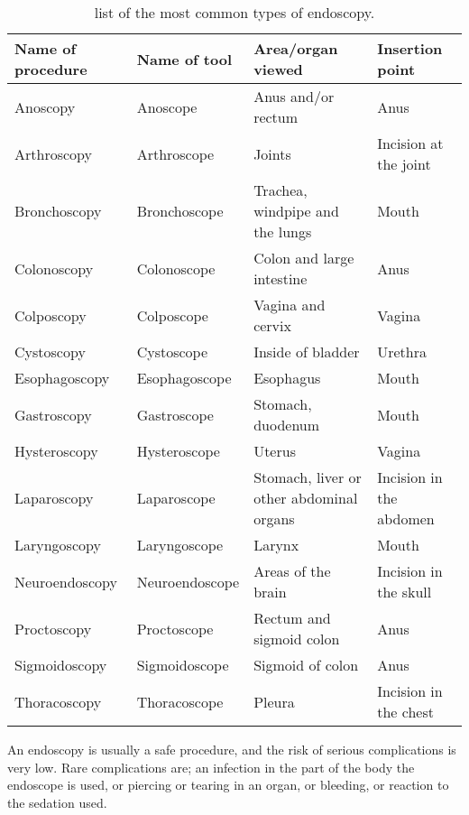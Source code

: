 \documentclass[thesis.tex]{subfiles}
\begin{document}
\begin{table} %
  \centering
  \begin{tabular}{ l l l l}
  	\hline
    Name of procedure	&Name of tool	&Area/organ viewed	&Insertion point	\\
    \hline
    Anoscopy			&Anoscope		&Anus and/or rectum	&Anus				\\
    Arthroscopy			&Arthroscope	&Joints				&Incision at the joint\\ 
    Bronchoscopy		&Bronchoscope	&Trachea, windpipe
    										and the lungs	&Mouth				\\ 
    Colonoscopy			&Colonoscope	&Colon and large
    										intestine		&Anus				\\				
    Colposcopy			&Colposcope		&Vagina and cervix	&Vagina				\\
    Cystoscopy			&Cystoscope		&Inside of bladder	&Urethra			\\
    Esophagoscopy		&Esophagoscope	&Esophagus			&Mouth				\\
    Gastroscopy			&Gastroscope	&Stomach, duodenum	&Mouth				\\
    Hysteroscopy		&Hysteroscope	&Uterus				&Vagina				\\
    Laparoscopy			&Laparoscope	&Stomach, liver or
    									other abdominal organs	&Incision in the abdomen \\
    Laryngoscopy		&Laryngoscope	&Larynx				&Mouth				\\
    Neuroendoscopy		&Neuroendoscope	&Areas of the brain	&Incision in the skull \\
    Proctoscopy			&Proctoscope	&Rectum and sigmoid
    										colon			&Anus				\\
    Sigmoidoscopy		&Sigmoidoscope	&Sigmoid of colon	&Anus				\\
    Thoracoscopy		&Thoracoscope	&Pleura				&Incision in the chest \\
    \hline
  \end{tabular}
  \caption[list of the most common types of endoscopy.]{list of the most common types of endoscopy.}
  \label{tab:endoscope_types}
\end{table}


\noindent
An endoscopy is usually a safe procedure, and the risk of serious complications is very low. Rare complications are; an infection in the part of the body the endoscope is used, or piercing or tearing in an organ, or bleeding, or reaction to the sedation used.
\end{document}
